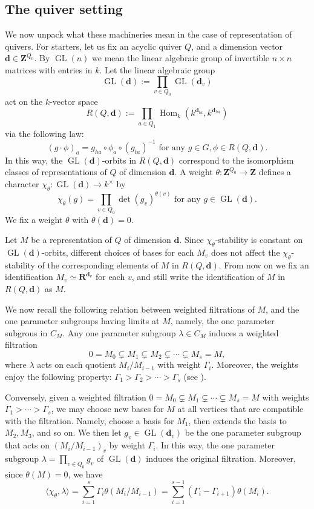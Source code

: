\documentclass[a4paper]{amsart}
\numberwithin{equation}{section}
\theoremstyle{plain}
\theoremstyle{definition}
\DeclareMathOperator{\Hom}{Hom}
\DeclareMathOperator{\GL}{GL}
\begin{document}
\subsection{The quiver setting}\label{the_quiver_setting}
We now unpack what these machineries mean in the case of representation of quivers. For starters, let us fix an acyclic quiver $Q$, and a dimension vector $\mathbf{d}\in\mathbf{Z}^{Q_{0}}$. By $\GL(n)$ we mean the linear algebraic group of invertible $n\times n$ matrices with entries in $k$. Let the linear algebraic group $$\GL(\mathbf{d}):=\prod_{v\in Q_0}\GL(\mathbf{d}_v)$$ act on the $k$-vector space $$R(Q,\mathbf{d}):=\prod_{a\in Q_1}\Hom_k(k^{\mathbf{d}_{ta}},k^{\mathbf{d}_{ha}})$$ via the following law: $$(g\cdot\phi)_a=g_{ha}\circ \phi_{a}\circ(g_{ta})^{-1}\text{ for any }g\in G, \phi\in R(Q,\mathbf{d}).$$ In this way, the $\GL(\mathbf{d})$-orbits in $R(Q,\mathbf{d})$ correspond to the isomorphism classes of representations of $Q$ of dimension $\mathbf{d}$. A weight $\theta:\mathbf{Z}^{Q_0}\rightarrow \mathbf{Z}$ defines a character $\chi_{\theta}:\GL(\mathbf{d})\rightarrow k^{\times}$ by $$\chi_{\theta}(g)=\prod_{v\in Q_0}\det(g_v)^{\theta(v)}\text{ for any }g\in \GL(\mathbf{d}).$$ We fix a weight $\theta$ with $\theta(\mathbf{d})=0$.

Let $M$ be a representation of $Q$ of dimension $\mathbf{d}$. Since $\chi_{\theta}$-stability is constant on $\GL(\mathbf{d})$-orbits, different choices of bases for each $M_v$ does not affect the $\chi_{\theta}$-stability of the corresponding elements of $M$ in $R(Q,\mathbf{d})$. From now on we fix an identification $M_v\simeq\mathbf{R}^{\mathbf{d}_v}$ for each $v$, and still write the identification of $M$ in $R(Q,\mathbf{d})$ as $M.$

We now recall the following relation between weighted filtrations of $M$, and the one parameter subgroups having limits at $M$, namely, the one parameter subgrous in $C_M$. Any one parameter subgroup $\lambda\in C_M$ induces a weighted filtration 
$$0=M_0\subsetneq M_1\subsetneq M_2\subsetneq\cdots \subsetneq M_s=M,$$ where $\lambda$ acts on each quotient $M_i/M_{i-1}$ with weight $\Gamma_i$. Moreover, the weights enjoy the following property:
 $\Gamma_1>\Gamma_2>\cdots>\Gamma_s$ (see \cite{MR1315461}). 

Conversely, given a weighted filtration $0=M_0\subsetneq M_1\subsetneq\cdots\subsetneq M_s=M$ with weights $\Gamma_1>\cdots>\Gamma_s$, we may choose new bases for $M$ at all vertices that are compatible with the filtration. Namely, choose a basis for $M_1$, then extends the basis to $M_2,M_3$, and so on. We then let $g_v\in\GL(\mathbf{d}_v)$ be the one parameter subgroup that acts on $(M_{i}/M_{i-1})_{v}$ by weight $\Gamma_i$. In this way, the one parameter subgroup $\lambda=\prod_{v\in Q_0}g_v$ of $\GL(\mathbf{d})$ induces the original filtration. Moreover, since $\theta(M)=0$, we have  \begin{equation}\label{hilbert-mum-index-original}\langle\chi_{\theta},\lambda\rangle=\sum_{i=1}^{s}\Gamma_i\theta(M_{i}/M_{i-1})=\sum_{i=1}^{s-1}(\Gamma_i-\Gamma_{i+1})\theta(M_i).\end{equation} 
\end{document}
